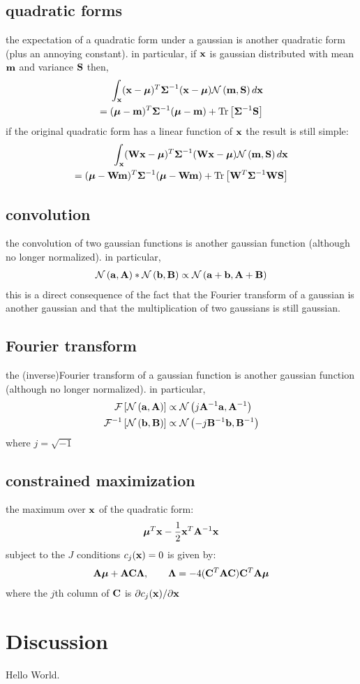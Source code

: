 \documentclass[12pt]{article}
\begin{document}
\subsection{quadratic forms}
the expectation of a quadratic form under a gaussian is another
quadratic form (plus an annoying constant). in particular,
if $\xx$ is gaussian distributed with mean $\mm$ and variance $\SS$ then,
\begin{align}
\int_{\xx}(\xx-\mmm)^T\Sm^{-1}(\xx-\mmm)\normal{\mm}{\SS}d\xx \\
= (\mmm-\mm)^T\Sm^{-1}(\mmm-\mm)+\trace{\Sm^{-1}\SS}
\end{align}
if the original quadratic form has a linear function of $\xx$ the
result is still simple:
\begin{align}
\int_{\xx}(\WW\xx-\mmm)^T\Sm^{-1}(\WW\xx-\mmm)\normal{\mm}{\SS}d\xx \\
= (\mmm-\WW\mm)^T\Sm^{-1}(\mmm-\WW\mm)+\trace{\WW^T\Sm^{-1}\WW\SS}
\end{align}

\subsection{convolution}
the convolution of two gaussian functions is another gaussian function
(although no longer normalized). in particular, 
\begin{align}
\normal{\aaa}{\AA} \ast \normal{\bb}{\BB} \propto \normal{\aaa+\bb}{\AA+\BB}
\end{align}
this is a direct consequence of the fact that the Fourier transform of
a gaussian is another gaussian and that the multiplication of two
gaussians is still gaussian.

\subsection{Fourier transform}
the (inverse)Fourier transform of a gaussian function is another gaussian
function (although no longer normalized). in particular,
\begin{align}
\mathcal{F}\left[\normal{\aaa}{\AA}\right] &\propto
\normal{j\AA^{-1}\aaa}{\AA^{-1}}\\
\mathcal{F}^{-1}\left[\normal{\bb}{\BB}\right] &\propto
\normal{-j\BB^{-1}\bb}{\BB^{-1}}
\end{align}
where $j=\sqrt{-1}$

\subsection{constrained maximization}
the maximum over $\xx$ of the quadratic form:
\begin{align}
\mmm^T\xx - \frac{1}{2}\xx^T\AA^{-1}\xx
\end{align} 
subject to the $J$ conditions $c_j(\xx)=0$  is given by:
\begin{align}
\AA\mmm + \AA\CC\Lm, \qquad \Lm = -4(\CC^T\AA\CC)\CC^T\AA\mmm
\end{align}
where the $j$th column of $\CC$ is $\partial c_j(\xx) / \partial \xx$

\clearpage
\section{Discussion}

Hello World.
\end{document}
